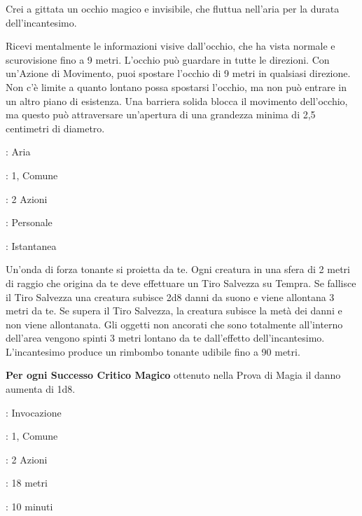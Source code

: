 \begin{multicols}{2}
Crei a gittata un occhio magico e invisibile, che fluttua nell'aria per la durata dell'incantesimo.

Ricevi mentalmente le informazioni visive dall'occhio, che ha vista normale e scurovisione fino a 9 metri. L'occhio può guardare in tutte le direzioni. Con un'Azione di Movimento, puoi spostare l'occhio di 9 metri in qualsiasi direzione. Non c'è limite a quanto lontano possa spostarsi l'occhio, ma non può entrare in un altro piano di esistenza. Una barriera solida blocca il movimento dell'occhio, ma questo può attraversare un'apertura di una grandezza minima di 2,5 centimetri di diametro.

\noindent\colorbox{OBSSgold!10}{
\begin{minipage}{0.95\linewidth}
\begin{description}[noitemsep, topsep=0pt, parsep=0pt, partopsep=0pt, leftmargin=0cm, labelwidth=1.3cm]
	\item[\textbf{Lista}]: Aria
	\item[\textbf{Livello}]: 1, Comune
	\item[\textbf{Lancio}]: 2 Azioni
	\item[\textbf{Gittata}]: Personale
	\item[\textbf{Durata}]: Istantanea
\end{description}
\end{minipage}}\smallskip

Un'onda di forza tonante si proietta da te. Ogni creatura in una sfera di 2 metri di raggio che origina da te deve effettuare un Tiro Salvezza su Tempra. Se fallisce il Tiro Salvezza una creatura subisce 2d8 danni da suono e viene allontana 3 metri da te. Se supera il Tiro Salvezza, la creatura subisce la metà dei danni e non viene allontanata. Gli oggetti non ancorati che sono totalmente all'interno dell'area vengono spinti 3 metri lontano da te dall'effetto dell'incantesimo. L'incantesimo produce un rimbombo tonante udibile fino a 90 metri.

\textbf{Per ogni Successo Critico Magico} ottenuto nella Prova di Magia il danno aumenta di 1d8.

\noindent\colorbox{OBSSgold!10}{
\begin{minipage}{0.95\linewidth}
\begin{description}[noitemsep, topsep=0pt, parsep=0pt, partopsep=0pt, leftmargin=0cm, labelwidth=1.3cm]
	\item[\textbf{Lista}]: Invocazione
	\item[\textbf{Livello}]: 1, Comune
	\item[\textbf{Lancio}]: 2 Azioni
	\item[\textbf{Gittata}]: 18 metri
	\item[\textbf{Durata}]: 10 minuti
\end{description}
\end{minipage}}\smallskip


\end{multicols}
